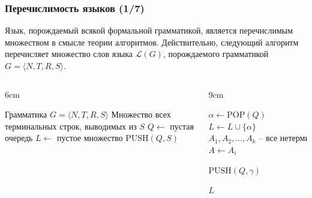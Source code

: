 \begin{frame}
    \frametitle{Перечислимость языков (1/7)}
    Язык, порождаемый всякой формальной грамматикой, является перечислимым множеством в смысле теории алгоритмов. Действительно, следующий алгоритм перечисляет множество слов языка $\mathcal{L}(G)$, порождаемого грамматикой $G = \langle N, T, R, S \rangle$.
    \begin{columns}[T]
        \begin{column}{6cm}
            \begin{algorithmic}
                    \REQUIRE Грамматика $G = \langle N, T, R, S \rangle$
                    \ENSURE Множество всех терминальных строк, выводимых из $S$
                    \STATE $Q \gets$ пустая очередь
                    \STATE $L \gets$ пустое множество
                    \STATE $\text{PUSH}(Q, S)$
                \end{algorithmic}
        \end{column}
        \begin{column}{9cm}
          \begin{algorithmic}
            \STATE $\alpha \gets \text{POP}(Q)$ 
                    \STATE $L \gets L \cup \{\alpha\}$
                    \ELSE
                    \STATE $A_1, A_2, \dots, A_k \text{ -- все нетерминалы в } \alpha$
                    \STATE $A \gets A_i$

                    \STATE $\text{PUSH}(Q, \gamma)$
                    \ENDFOR
                    \ENDFOR
                    \ENDIF
                    \ENDWHILE

                    \RETURN $L$
                \end{algorithmic}
       \end{column}
    \end{columns}
\end{frame}

